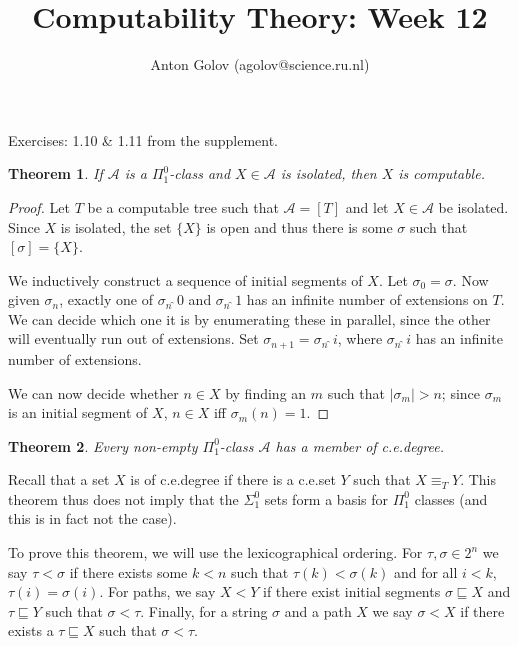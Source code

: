\documentclass{article}
\title{Computability Theory: Week 12}
\author{Anton Golov (agolov@science.ru.nl)}
\newtheorem{theorem}{Theorem}
\newcommand{\set}[1]{\{ #1 \}}
\newcommand{\PiOne}{\Pi^0_1}
\newcommand{\Cons}{\widehat{\,\,}}
\begin{document}
  \maketitle

  Exercises: 1.10 \& 1.11 from the supplement.

  \begin{theorem}
    If $\mathcal{A}$ is a $\PiOne$-class and $X \in \mathcal{A}$ is isolated, then $X$ is computable.
  \end{theorem}

  \begin{proof}
    Let $T$ be a computable tree such that $\mathcal{A} = [T]$ and let $X \in \mathcal{A}$ be isolated.  Since $X$ is
    isolated, the set $\set{X}$ is open and thus there is some $\sigma$ such that $[\sigma] = \set{X}$.

    We inductively construct a sequence of initial segments of $X$.  Let $\sigma_0 = \sigma$.  Now given $\sigma_n$,
    exactly one of $\sigma_n \Cons 0$ and $\sigma_n \Cons 1$ has an infinite number of extensions on $T$.  We can decide
    which one it is by enumerating these in parallel, since the other will eventually run out of extensions.  Set
    $\sigma_{n+1} = \sigma_n \Cons i$, where $\sigma_n \Cons i$ has an infinite number of extensions.

    We can now decide whether $n \in X$ by finding an $m$ such that $|\sigma_m| > n$; since $\sigma_m$ is an initial
    segment of $X$, $n \in X$ iff $\sigma_m(n) = 1$.
  \end{proof}

  \begin{theorem}
    Every non-empty $\PiOne$-class $\mathcal{A}$ has a member of c.e.\@ degree.
  \end{theorem}

  Recall that a set $X$ is of c.e.\@ degree if there is a c.e.\@ set $Y$ such that $X \equiv_T Y$.  This theorem thus
  does not imply that the $\Sigma^0_1$ sets form a basis for $\Pi^0_1$ classes (and this is in fact not the case).

  To prove this theorem, we will use the lexicographical ordering.  For $\tau, \sigma \in 2^n$ we say $\tau < \sigma$ if
  there exists some $k < n$ such that $\tau(k) < \sigma(k)$ and for all $i < k$, $\tau(i) = \sigma(i)$.  For paths, we
  say $X < Y$ if there exist initial segments $\sigma \sqsubseteq X$ and $\tau \sqsubseteq Y$ such that $\sigma < \tau$.
  Finally, for a string $\sigma$ and a path $X$ we say $\sigma < X$ if there exists a $\tau \sqsubseteq X$ such that
  $\sigma < \tau$.
\end{document}
